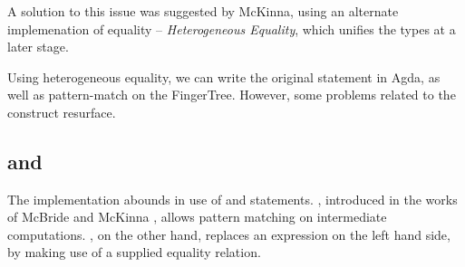 \documentclass[12pt,twoside,notitlepage]{report}
\begin{document}
\begin{code}
\\
\> \AgdaSymbol{:}  \AgdaSymbol{\{}\AgdaSymbol{\}\{} \AgdaSymbol{:}  \AgdaSymbol{\}} \AgdaSymbol{\{} \AgdaSymbol{:}   \AgdaSymbol{\}}\<%
\\
\>[2]\<[14]%
\>[14]  \AgdaSymbol{:}   \<%
\\
\>[2]\<[14]%
\>[14]  \AgdaSymbol{:}    \<%
\\
\>[2]\<[14]%
\>[14] \AgdaSymbol{(} \AgdaSymbol{:}   \AgdaSymbol{)}\<%
\\
\>[2]\<[14]%
\>[14] \AgdaSymbol{(}   \AgdaSymbol{)}\<%
\\
\>[2]\<[14]%
\>[14] \AgdaSymbol{(}  \AgdaSymbol{)}\<%
\\
\>   \AgdaSymbol{=} \<%
\\
\> \AgdaSymbol{(} \AgdaSymbol{)} \AgdaSymbol{()}\<%
\\
\> \AgdaSymbol{(}    \AgdaSymbol{)} \AgdaSymbol{()}\<%
\\
\end{code}

A solution to this issue was suggested by McKinna\cite{hetero}, using an alternate implemenation of equality -- \textit{Heterogeneous Equality}, which unifies the types at a later stage.

Using heterogeneous equality, we can write the original statement in Agda, as well as pattern-match on the FingerTree. However, some problems related to the  construct resurface.

\subsection{ and }
\label{sec:with}
The implementation abounds in use of  and  statements. , introduced in the works of McBride and McKinna \cite{viewleft}, allows pattern matching on intermediate computations. , on the other hand, replaces an expression on the left hand side, by making use of a supplied equality relation.
\end{document}
